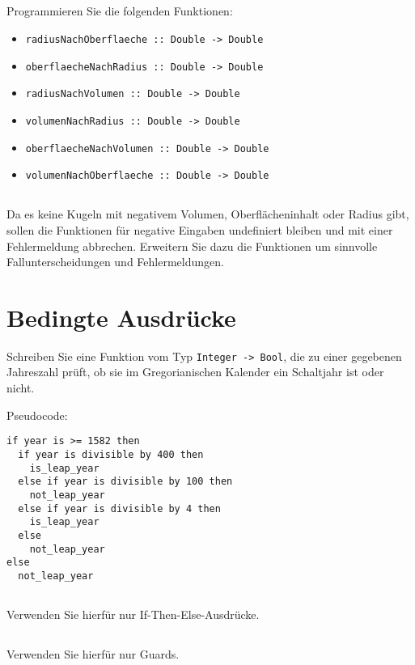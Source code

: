 \documentclass[
  10pt,                   %
  DIV12,
  german,                 %
  oneside,                %
  parskip=half,           %
  headings=normal,        %
  captions=tableheading,  %
]{scrartcl}
\begin{document}
\subsection{}
Programmieren Sie die folgenden Funktionen:\\
\begin{itemize}
\item \lstinline|radiusNachOberflaeche :: Double -> Double|
\item \lstinline|oberflaecheNachRadius :: Double -> Double|
\item \lstinline|radiusNachVolumen :: Double -> Double|
\item \lstinline|volumenNachRadius :: Double -> Double|
\item \lstinline|oberflaecheNachVolumen :: Double -> Double|
\item \lstinline|volumenNachOberflaeche :: Double -> Double|
\end{itemize}
\subsection{}
Da es keine Kugeln mit negativem Volumen, Oberflächeninhalt oder Radius
gibt, sollen die Funktionen für negative Eingaben undefiniert bleiben und mit
einer Fehlermeldung abbrechen. Erweitern Sie dazu die Funktionen um sinnvolle
Fallunterscheidungen und Fehlermeldungen.

\section{Bedingte Ausdrücke}
Schreiben Sie eine Funktion vom Typ \lstinline|Integer -> Bool|, die zu einer gegebenen Jahreszahl prüft, ob sie im Gregorianischen Kalender ein Schaltjahr ist oder nicht.

Pseudocode:
\begin{lstlisting}
if year is >= 1582 then 
  if year is divisible by 400 then
    is_leap_year
  else if year is divisible by 100 then
    not_leap_year
  else if year is divisible by 4 then
    is_leap_year
  else
    not_leap_year
else
  not_leap_year
\end{lstlisting}
\subsection{}
Verwenden Sie hierfür nur If-Then-Else-Ausdrücke.
\subsection{}
Verwenden Sie hierfür nur Guards.
\end{document}
